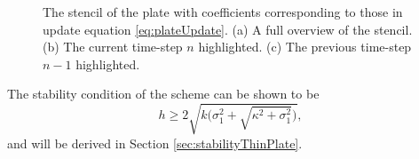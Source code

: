 \begin{figure}[t]
    \caption{The stencil of the plate with coefficients corresponding to those in update equation \eqref{eq:plateUpdate}. (a) A full overview of the stencil. (b) The current time-step $n$ highlighted. (c) The previous time-step $n-1$ highlighted. \label{fig:plateStencil}}
\end{figure}
%
The stability condition of the scheme can be shown to be
\begin{equation}\label{eq:stabilityPlate}
    h \geq 2\sqrt{k\bigg(\sigma_1^2 + \sqrt{\kappa^2+ \sigma_1^2}\bigg)},
\end{equation}
and will be derived in Section \ref{sec:stabilityThinPlate}.

